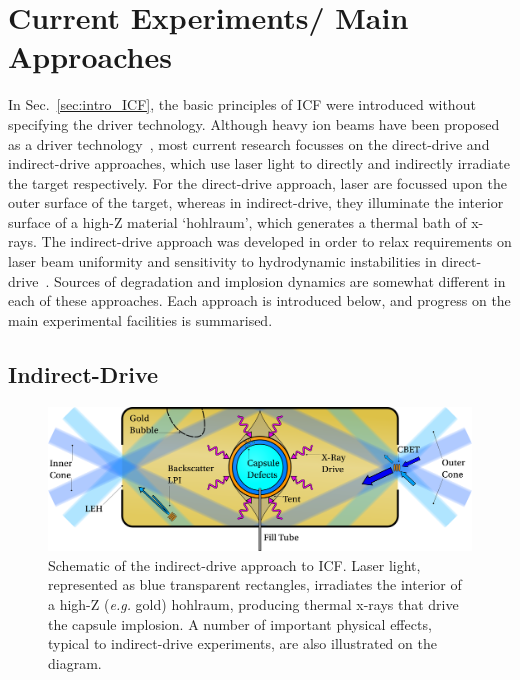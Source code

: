\section{Current Experiments/ Main Approaches}%
\label{sec:intro_mainexperiments}

In Sec.~\ref{sec:intro_ICF}, the basic principles of \ac{ICF} were introduced without specifying the driver technology.
Although heavy ion beams have been proposed as a driver technology~\cite{metzler_target_1984}, most current research focusses on the direct-drive and indirect-drive approaches, which use laser light to directly and indirectly irradiate the target respectively.
For the direct-drive approach, laser are focussed upon the outer surface of the target, whereas in indirect-drive, they illuminate the interior surface of a high-Z material `hohlraum', which generates a thermal bath of x-rays.
The indirect-drive approach was developed in order to relax requirements on laser beam uniformity and sensitivity to hydrodynamic instabilities in direct-drive~\cite{lindl_development_1995}.
Sources of degradation and implosion dynamics are somewhat different in each of these approaches.
Each approach is introduced below, and progress on the main experimental facilities is summarised.

\subsection{Indirect-Drive}%
\label{sec:intro_indirect}

\begin{figure}[t!]
    \includegraphics[width=\linewidth]{Introduction/Images/indirect icf white.png}
    \centering
    \caption{Schematic of the indirect-drive approach to \ac{ICF}.
    Laser light, represented as blue transparent rectangles, irradiates the interior of a high-Z (\textit{e.g.} gold) hohlraum, producing thermal x-rays that drive the capsule implosion.
    A number of important physical effects, typical to indirect-drive experiments, are also illustrated on the diagram.
    }%
    \label{fig:intro_indirect}
\end{figure}

